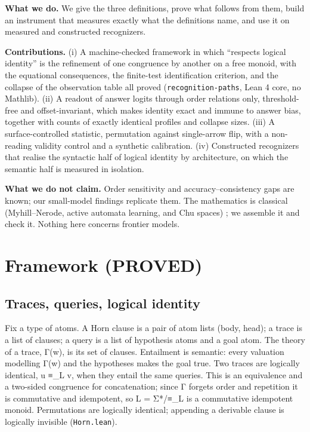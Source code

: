\textbf{What we do.} We give the three definitions, prove what follows
from them, build an instrument that measures exactly what the
definitions name, and use it on measured and constructed recognizers.

\textbf{Contributions.} (i) A machine-checked framework in which
``respects logical identity'' is the refinement of one congruence by
another on a free monoid, with the equational consequences, the
finite-test identification criterion, and the collapse of the
observation table all proved (\texttt{recognition-paths}, Lean 4 core,
no Mathlib). (ii) A readout of answer logits through order relations
only, threshold-free and offset-invariant, which makes identity exact
and immune to answer bias, together with counts of exactly identical
profiles and collapse sizes. (iii) A surface-controlled statistic,
permutation against single-arrow flip, with a non-reading validity
control and a synthetic calibration. (iv) Constructed recognizers that
realise the syntactic half of logical identity by architecture, on which
the semantic half is measured in isolation.

\textbf{What we do not claim.} Order sensitivity and
accuracy--consistency gaps are known; our small-model findings replicate
them. The mathematics is classical (Myhill--Nerode, active automata
learning, and Chu spaces) \cite{angluin1987learning,pratt1995chu}; we assemble
it and check it. Nothing here concerns frontier
models.

\hypertarget{framework-proved}{%
\section{Framework (PROVED)}\label{framework-proved}}

\hypertarget{traces-queries-logical-identity}{%
\subsection{Traces, queries, logical
identity}\label{traces-queries-logical-identity}}

Fix a type of atoms. A Horn clause is a pair of atom lists (body, head);
a trace is a list of clauses; a query is a list of hypothesis atoms and
a goal atom. The theory of a trace, Γ(w), is its set of clauses.
Entailment is semantic: every valuation modelling Γ(w) and the
hypotheses makes the goal true. Two traces are logically identical, u
≡\_L v, when they entail the same queries. This is an equivalence and a
two-sided congruence for concatenation; since Γ forgets order and
repetition it is commutative and idempotent, so L = Σ*/≡\_L is a
commutative idempotent monoid. Permutations are logically identical;
appending a derivable clause is logically invisible
(\texttt{Horn.lean}).

